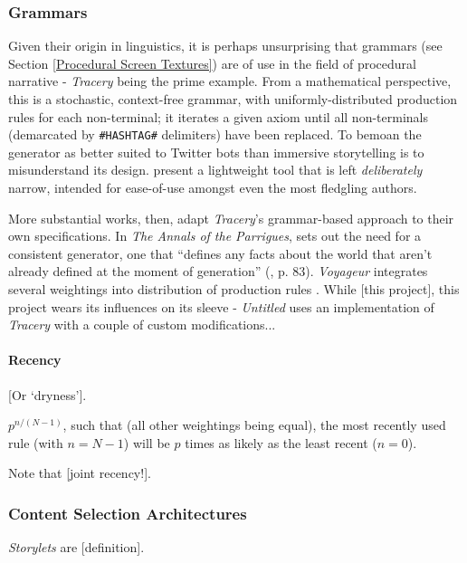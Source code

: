 \documentclass[a4paper, 11pt]{article}
\begin{document}
\begin{flushleft}
\subsubsection{Grammars}

Given their origin in linguistics, it is perhaps unsurprising that grammars (see Section \ref{Procedural Screen Textures}) are of use in the field of procedural narrative - \textit{Tracery} \citep{comptonTracery} being the prime example. From a mathematical perspective, this is a stochastic, context-free grammar, with uniformly-distributed production rules for each non-terminal; it iterates a given axiom until all non-terminals (demarcated by \texttt{\#HASHTAG\#} delimiters) have been replaced. To bemoan the generator as better suited to Twitter bots than immersive storytelling is to misunderstand its design. \citeauthor{comptonTracery} present a lightweight tool that is left \textit{deliberately} narrow, intended for ease-of-use amongst even the most fledgling authors.

\vspace{5pt}\noindent
More substantial works, then, adapt \textit{Tracery}'s grammar-based approach to their own specifications. In \textit{The Annals of the Parrigues}, \citeauthor{shortParrigues} sets out the need for a consistent generator, one that ``defines any facts about the world that aren’t already defined at the moment of generation'' (\citeyear{shortParrigues}, p. 83). \textit{Voyageur} \citep{diasVoyageur} integrates several weightings into distribution of production rules \citep{diasVoyageurDescriptions}. While [this project], this project wears its influences on its sleeve - \textit{Untitled} uses an implementation of \textit{Tracery} with a couple of custom modifications...

\paragraph{Recency} [Or `dryness'].

$p^{n/(N-1)}$, such that (all other weightings being equal), the most recently used rule (with $n = N-1$) will be $p$ times as likely as the least recent ($n = 0$).

\vspace{5pt}\noindent
Note that [joint recency!].

\subsubsection{Content Selection Architectures} \textit{Storylets} \citep{kreminskiStorylets} are [definition].


\end{flushleft}
\end{document}

